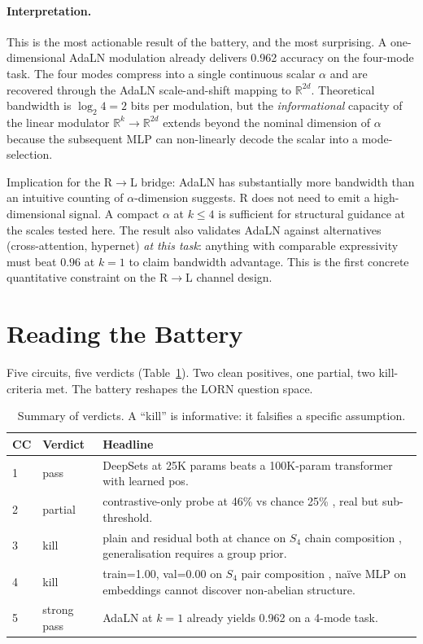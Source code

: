 \documentclass[10pt, twocolumn, a4paper]{article}
\newcommand{\R}{\mathbb{R}}
\begin{document}
\paragraph{Interpretation.} This is the most actionable result of the battery, and the most surprising. A one-dimensional AdaLN modulation already delivers 0.962 accuracy on the four-mode task. The four modes compress into a single continuous scalar $\alpha$ and are recovered through the AdaLN scale-and-shift mapping to $\R^{2d}$. Theoretical bandwidth is $\log_2 4 = 2$ bits per modulation, but the \emph{informational} capacity of the linear modulator $\mathbb{R}^k \to \mathbb{R}^{2d}$ extends beyond the nominal dimension of $\alpha$ because the subsequent MLP can non-linearly decode the scalar into a mode-selection.

Implication for the R$\to$L bridge: AdaLN has substantially more bandwidth than an intuitive counting of $\alpha$-dimension suggests. R does not need to emit a high-dimensional signal. A compact $\alpha$ at $k \le 4$ is sufficient for structural guidance at the scales tested here. The result also validates AdaLN against alternatives (cross-attention, hypernet) \emph{at this task}: anything with comparable expressivity must beat $0.96$ at $k=1$ to claim bandwidth advantage. This is the first concrete quantitative constraint on the R$\to$L channel design.

\section{Reading the Battery}

Five circuits, five verdicts (Table~\ref{tab:summary}). Two clean positives, one partial, two kill-criteria met. The battery reshapes the LORN question space.

\begin{table}[t]
\centering\small
\caption{Summary of verdicts. A ``kill'' is informative: it falsifies a specific assumption.}
\label{tab:summary}
\begin{tabular}{llp{5.3cm}}
\toprule
CC & Verdict & Headline \\
\midrule
1 & pass         & DeepSets at 25K params beats a 100K-param transformer with learned pos. \\
2 & partial      & contrastive-only probe at 46\% vs chance 25\% ,  real but sub-threshold. \\
3 & kill         & plain and residual both at chance on $S_4$ chain composition ,  generalisation requires a group prior. \\
4 & kill         & train=1.00, val=0.00 on $S_4$ pair composition ,  na\"{i}ve MLP on embeddings cannot discover non-abelian structure. \\
5 & strong pass  & AdaLN at $k=1$ already yields 0.962 on a 4-mode task. \\
\bottomrule
\end{tabular}
\end{table}
\end{document}
